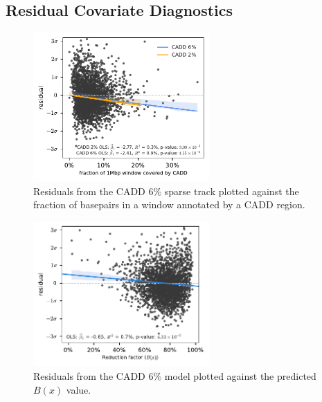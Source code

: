 \documentclass[11pt]{article}
\begin{document}
\subsection{Residual Covariate Diagnostics}

\begin{figure}[htbp]
  \label{suppfig:resid-cadd}
  \centering
  \includegraphics[width=0.6\textwidth]{figures/supplementary/cadd_residual.pdf}
  \caption{Residuals from the CADD 6\% sparse track plotted against the fraction of
  basepairs in a window annotated by a CADD region.}
\end{figure}

\begin{figure}[htbp]
  \label{suppfig:resid-b}
  \centering
  \includegraphics[width=0.6\textwidth]{figures/supplementary/b_resid.pdf}
  \caption{Residuals from the CADD 6\% model plotted against the predicted $B(x)$
           value.}
\end{figure}
\end{document}
